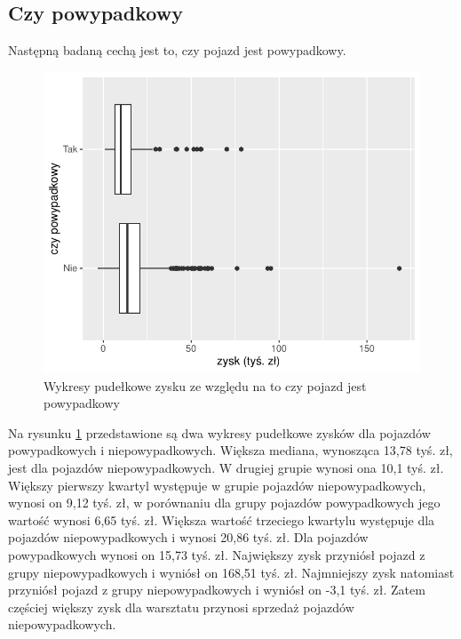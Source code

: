 \documentclass{article}\usepackage[]{graphicx}\usepackage[]{xcolor}
\makeatletter
\def\maxwidth{ %
  \ifdim\Gin@nat@width>\linewidth
    \linewidth
  \else
    \Gin@nat@width
  \fi
}
\newenvironment{knitrout}{}{} %
\makeatother
\begin{document}
\subsection{Czy powypadkowy}

Następną badaną cechą jest to, czy pojazd jest powypadkowy.

\begin{knitrout}
\color{fgcolor}\begin{figure}[H]

{\centering \includegraphics[width=\maxwidth]{figure/fig_wypadkowy-1} 

}

\caption[Wykresy pudełkowe zysku ze względu na to czy pojazd jest powypadkowy]{Wykresy pudełkowe zysku ze względu na to czy pojazd jest powypadkowy}\label{fig:fig_wypadkowy}
\end{figure}

\end{knitrout}

Na rysunku \ref{fig:fig_wypadkowy} przedstawione są dwa wykresy pudełkowe zysków dla pojazdów powypadkowych i niepowypadkowych. Większa mediana, wynosząca 13,78 tyś. zł, jest dla pojazdów niepowypadkowych. W drugiej grupie wynosi ona 10,1 tyś. zł. 
Większy pierwszy kwartyl występuje w grupie pojazdów niepowypadkowych, wynosi on 9,12 tyś. zł, w porównaniu dla grupy pojazdów powypadkowych jego wartość wynosi 6,65 tyś. zł.
Większa wartość trzeciego kwartylu występuje dla pojazdów niepowypadkowych i wynosi 20,86 tyś. zł. Dla pojazdów powypadkowych wynosi on 15,73 tyś. zł.
Największy zysk przyniósł pojazd z grupy niepowypadkowych i wyniósł on 168,51 tyś. zł. 
Najmniejszy zysk natomiast przyniósł pojazd z grupy niepowypadkowych i wyniósł on -3,1 tyś. zł. Zatem częściej większy zysk dla warsztatu przynosi sprzedaż pojazdów niepowypadkowych. 
\end{document}
